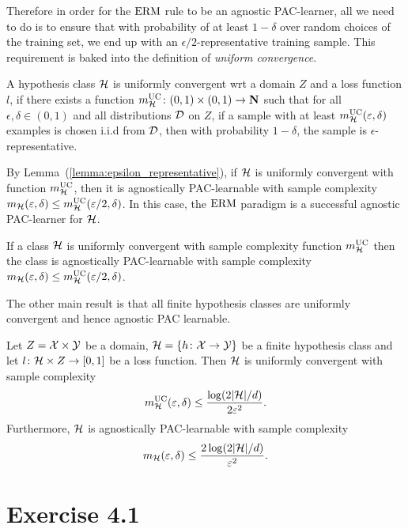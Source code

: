 Therefore in order for the $\operatorname{ERM}$ rule to be an agnostic PAC-learner, all we
need to do is to ensure that with probability of at least $1 - \delta$ over
random choices of the training set, we end up with an
$\epsilon/2$-representative training sample. This requirement is baked into
the definition of \emph{uniform convergence}.

\begin{definition}
A hypothesis class $\mathcal{H}$ is uniformly convergent wrt a domain $Z$
and a loss function $l$, if there exists a function
$m_{\mathcal{H}}^{\text{UC}} \colon (0, 1) \times (0, 1) \rightarrow \mathbf{N}$ such that
for all $\epsilon, \delta \in (0, 1)$ and all distributions $\mathcal{D}$ on $Z$,
if a sample with at least $m_{\mathcal{H}}^{\text{UC}}(\varepsilon, \delta)$ examples is chosen
i.i.d from $\mathcal{D}$, then with probability $1 - \delta$, the sample is
$\epsilon$-representative.
\end{definition}

By Lemma~(\ref{lemma:epsilon_representative}), if $\mathcal{H}$ is uniformly
convergent with function $m_{\mathcal{H}}^{\text{UC}}$, then it is agnostically PAC-learnable
with sample complexity $m_{\mathcal{H}}(\varepsilon, \delta) \leq
m_{\mathcal{H}}^{\text{UC}}(\varepsilon / 2, \delta)$. In this case, the $\operatorname{ERM}$ paradigm is a
successful agnostic PAC-learner for $\mathcal{H}$.
\begin{corollary}
If a class $\mathcal{H}$ is uniformly convergent with sample complexity function
$m_{\mathcal{H}}^{\text{UC}}$ then the class is agnostically PAC-learnable with sample complexity
$m_{\mathcal{H}}(\varepsilon, \delta) \leq m_{\mathcal{H}}^{\text{UC}}(\varepsilon / 2, \delta)$.
\end{corollary}

The other main result is that all finite hypothesis classes are uniformly convergent
and hence agnostic PAC learnable.
\begin{theorem}
Let  $Z = \mathcal{X} \times \mathcal{Y}$ be a domain, $\mathcal{H} = \{h \colon \mathcal{X} \rightarrow \mathcal{Y} \}$ be a finite hypothesis class and let $l \colon \mathcal{H} \times Z \rightarrow [0, 1]$ be a loss function. Then $\mathcal{H}$ is uniformly convergent with sample complexity
\[
	m_{\mathcal{H}}^{\text{UC}}(\varepsilon, \delta) \leq \frac{\log (2 |\mathcal{H}| / d)}{2 \varepsilon^2}.
\] 
Furthermore, $\mathcal{H}$ is agnostically PAC-learnable with sample complexity
\[
	m_{\mathcal{H}}(\varepsilon, \delta) \leq \frac{2 \log (2 |\mathcal{H}| / d)}{\varepsilon^2}.
\]
\end{theorem}

\section*{Exercise 4.1}

